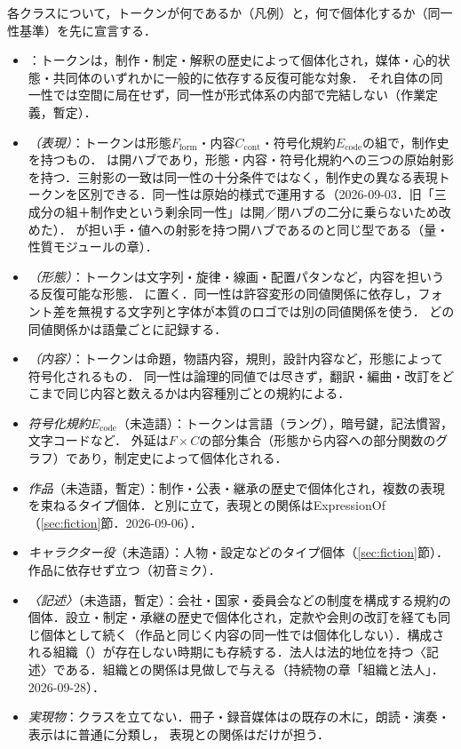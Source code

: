 \documentclass[../../main-detail.tex]{subfiles}
\begin{document}
各クラスについて，トークンが何であるか（凡例）と，何で個体化するか（同一性基準）を先に宣言する．
\begin{itemize}
    \item \emph{}：トークンは，制作・制定・解釈の歴史によって個体化され，媒体・心的状態・共同体のいずれかに一般的に依存する反復可能な対象．
    それ自体の同一性では空間に局在せず，同一性が形式体系の内部で完結しない（作業定義，暫定）．
    \item \emph{（表現）}：トークンは形態$F_{\mathrm{form}}$・内容$C_{\mathrm{cont}}$・符号化規約$E_{\mathrm{code}}$の組で，制作史を持つもの．
    は開ハブであり，形態・内容・符号化規約への三つの原始射影を持つ．三射影の一致は同一性の十分条件ではなく，制作史の異なる表現トークンを区別できる．同一性は原始的様式で運用する（2026-09-03．旧「三成分の組＋制作史という剰余同一性」は開／閉ハブの二分に乗らないため改めた）．
    が担い手・値への射影を持つ開ハブであるのと同じ型である（量・性質モジュールの章）．
    \item \emph{（形態）}：トークンは文字列・旋律・線画・配置パタンなど，内容を担いうる反復可能な形態．
    に置く．同一性は許容変形の同値関係に依存し，フォント差を無視する文字列と字体が本質のロゴでは別の同値関係を使う．
    どの同値関係かは語彙ごとに記録する．
    \item \emph{（内容）}：トークンは命題，物語内容，規則，設計内容など，形態によって符号化されるもの．
    同一性は論理的同値では尽きず，翻訳・編曲・改訂をどこまで同じ内容と数えるかは内容種別ごとの規約による．
    \item \emph{符号化規約$E_{\mathrm{code}}$}（未造語）：トークンは言語（ラング），暗号鍵，記法慣習，文字コードなど．
    外延は$F\times C$の部分集合（形態から内容への部分関数のグラフ）であり，制定史によって個体化される．
    \item \emph{作品}（未造語，暫定）：制作・公表・継承の歴史で個体化され，複数の表現を束ねるタイプ個体．と別に立て，表現との関係はExpressionOf（\ref{sec:fiction}節．2026-09-06）．
    \item \emph{キャラクター役}（未造語）：人物・設定などのタイプ個体（\ref{sec:fiction}節）．作品に依存せず立つ（初音ミク）．
    \item \emph{〈記述〉}（未造語，暫定）：会社・国家・委員会などの制度を構成する規約の個体．設立・制定・承継の歴史で個体化され，定款や会則の改訂を経ても同じ個体として続く（作品と同じく内容の同一性では個体化しない）．構成される組織（）が存在しない時期にも存続する．法人は法的地位を持つ〈記述〉である．組織との関係は見做しで与える（持続物の章「組織と法人」．2026-09-28）．
    \item \emph{実現物}：クラスを立てない．冊子・録音媒体はの既存の木に，朗読・演奏・表示はに普通に分類し，
    表現との関係はだけが担う．
\end{itemize}
\end{document}

